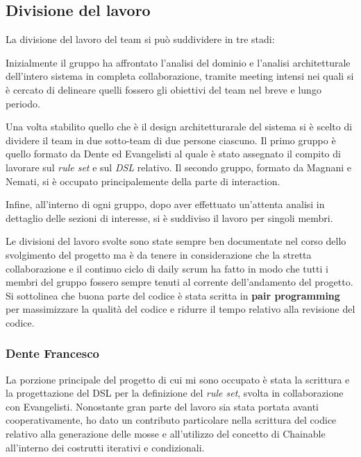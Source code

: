 
\subsection{Divisione del lavoro}
La divisione del lavoro del team si può suddividere in tre stadi:
%
\begin{inparaenum}[1)]
\item Inizialmente il gruppo ha affrontato l'analisi del dominio e l'analisi architetturale dell'intero sistema in completa collaborazione, tramite meeting intensi nei quali si è cercato di delineare quelli fossero gli obiettivi del team nel breve e lungo periodo.
%
\item Una volta stabilito quello che è il design architetturarale del sistema si è scelto di dividere il team in due sotto-team di due persone ciascuno.
%
Il primo gruppo è quello formato da Dente ed Evangelisti al quale è stato assegnato il compito di lavorare sul \textit{rule set} e sul \textit{DSL} relativo.
%
Il secondo gruppo, formato da Magnani e Nemati, si è occupato principalemente della parte di interaction.
%
\item Infine, all'interno di ogni gruppo, dopo aver effettuato un'attenta analisi in dettaglio delle sezioni di interesse, si è suddiviso il lavoro per singoli membri.
\end{inparaenum}

Le divisioni del lavoro svolte sono state sempre ben documentate nel corso dello svolgimento del progetto ma è da tenere in considerazione che la stretta collaborazione e il continuo ciclo di daily scrum ha fatto in modo che tutti i membri del gruppo fossero sempre tenuti al corrente dell'andamento del progetto.
%
Si sottolinea che buona parte del codice è stata scritta in \textbf{pair programming} per massimizzare la qualità del codice e ridurre il tempo relativo alla revisione del codice.

\subsubsection{Dente Francesco}

La porzione principale del progetto di cui mi sono occupato è stata la scrittura e la progettazione del DSL per la definizione del \textit{rule set}, svolta in collaborazione con Evangelisti.
%
Nonostante gran parte del lavoro sia stata portata avanti cooperativamente, ho dato un contributo particolare nella scrittura del codice relativo alla generazione delle mosse e all'utilizzo del concetto di Chainable all'interno dei costrutti iterativi e condizionali.

